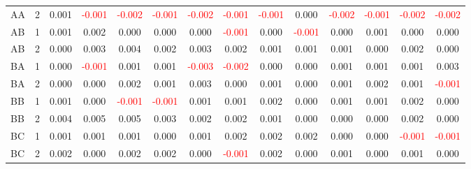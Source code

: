 \begin{table}[H]
{\begin{tabular}{llcccccccccccc}
AA & 2 & 0.001 & \textcolor{red}{-0.001} & \textcolor{red}{-0.002} & \textcolor{red}{-0.001} & \textcolor{red}{-0.002} & \textcolor{red}{-0.001} & \textcolor{red}{-0.001} & 0.000 & \textcolor{red}{-0.002} & \textcolor{red}{-0.001} & \textcolor{red}{-0.002} & \textcolor{red}{-0.002}\\
AB & 1 & 0.001 & 0.002 & 0.000 & 0.000 & 0.000 & \textcolor{red}{-0.001} & 0.000 & \textcolor{red}{-0.001} & 0.000 & 0.001 & 0.000 & 0.000\\
AB & 2 & 0.000 & 0.003 & 0.004 & 0.002 & 0.003 & 0.002 & 0.001 & 0.001 & 0.001 & 0.000 & 0.002 & 0.000\\
BA & 1 & 0.000 & \textcolor{red}{-0.001} & 0.001 & 0.001 & \textcolor{red}{-0.003} & \textcolor{red}{-0.002} & 0.000 & 0.000 & 0.001 & 0.001 & 0.001 & 0.003\\
BA & 2 & 0.000 & 0.000 & 0.002 & 0.001 & 0.003 & 0.000 & 0.001 & 0.000 & 0.001 & 0.002 & 0.001 & \textcolor{red}{-0.001}\\
BB & 1 & 0.001 & 0.000 & \textcolor{red}{-0.001} & \textcolor{red}{-0.001} & 0.001 & 0.001 & 0.002 & 0.000 & 0.001 & 0.001 & 0.002 & 0.000\\
BB & 2 & 0.004 & 0.005 & 0.005 & 0.003 & 0.002 & 0.002 & 0.001 & 0.000 & 0.000 & 0.000 & 0.002 & 0.000\\
BC & 1 & 0.001 & 0.001 & 0.001 & 0.000 & 0.001 & 0.002 & 0.002 & 0.002 & 0.000 & 0.000 & \textcolor{red}{-0.001} & \textcolor{red}{-0.001}\\
BC & 2 & 0.002 & 0.000 & 0.002 & 0.002 & 0.000 & \textcolor{red}{-0.001} & 0.002 & 0.000 & 0.001 & 0.000 & 0.001 & 0.000\\
\hline
    \end{tabular}%
    }
    \label{tab:cen3_uni}
\end{table}




